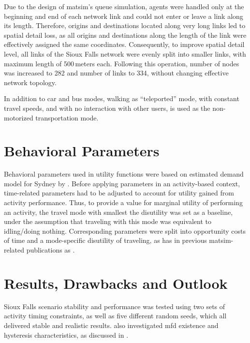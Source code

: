 Due to the design of \gls{matsim}’s queue simulation, agents were handled only at the beginning and end of each network link and could not enter or leave a link along its length. Therefore, origins and destinations located along very long links led to spatial detail loss, as all origins and destinations along the length of the link were effectively assigned the same coordinates. Consequently, to improve spatial detail level, all links of the Sioux Falls network were evenly split into smaller links, with maximum length of 500\,meters each. Following this operation, number of nodes was increased to 282 and number of links to 334, without changing effective network topology.

In addition to car and bus modes, walking as ``\gls{teleported}'' mode, with constant travel speeds, and with no interaction with other users, is used as the non-motorized transportation mode. 

\section{Behavioral Parameters}
Behavioral parameters used in utility functions were based on estimated demand model for Sydney by \citet[][]{TirachiniHensherRose_TransResB_2014}. Before applying parameters in an activity-based context, time-related parameters had to be adjusted to account for utility gained from activity performance. Thus, to provide a value for marginal utility of performing an activity, the travel mode with smallest the disutility was set as a baseline, under the assumption that traveling with this mode was equivalent to idling/doing nothing. Corresponding parameters were split into opportunity costs of time and a mode-specific disutility of traveling, as has in previous \gls{matsim}-related publications as \citet[e.g,][]{KickhoeferEtAl_Transportation_2011}. 

\section{Results, Drawbacks and Outlook}
Sioux Falls scenario stability and performance was tested using two sets of activity timing constraints, as well as five different random seeds, which all delivered stable and realistic results. \citet[][]{ChakirovFourie_TechRep_FCL_2014} also investigated \gls{mfd} existence and hysteresis characteristics, as discussed in \citet[][]{GeroliminisDaganzo_TRB_2007, GeroliminisDaganzo_TransResB_2008, GeroliminisSun_TransResA_2011}. 

